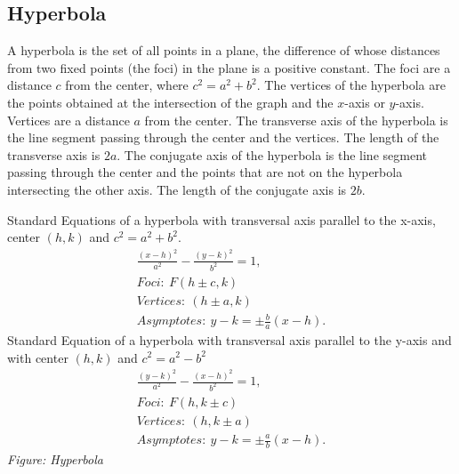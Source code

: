 \documentclass{report}
\begin{document}
      \subsection{Hyperbola}
        \smallbreak \noindent
        \begin{definition}
              \noindent A hyperbola is the set of all points in a plane, the difference of whose distances from two fixed points (the foci) in the plane is a positive constant. The foci are a distance $c$ from the center, where $c^2 = a^2 + b^2$.
          \noindent The vertices of the hyperbola are the points obtained at the intersection of the graph and the $x$-axis or $y$-axis. Vertices are a distance $a$ from the center.
          \noindent The transverse axis of the hyperbola is the line segment passing through the center and the vertices. The length of the transverse axis is $2a$.
          \noindent The conjugate axis of the hyperbola is the line segment passing through the center and the points that are not on the hyperbola intersecting the other axis. The length of the conjugate axis is $2b$.
        \end{definition}
      \bigbreak \noindent 
      \noindent Standard Equations of a hyperbola with transversal axis parallel to the x-axis, center $(h, k)$ and $c^2 = a^2 + b^2$.
      \begin{align*}
        \frac{(x-h)^{2}}{a^{2}} - \frac{(y-k)^{2}}{b^{2}} = 1, \\
         Foci:\ F(h \pm c,k) \\
        Vertices:\ (h \pm a,k) \\
        Asymptotes:\ y-k  = \pm \frac{b}{a}(x-h)
    .\end{align*}
    \bigbreak \noindent \bigbreak \noindent 
    Standard Equation of a hyperbola with transversal axis parallel to the y-axis and with center $(h, k)$ and $c^2 = a^2 - b^2$
    \begin{align*}
      \frac{(y-k)^{2}}{a^{2}} - \frac{(x-h)^{2}}{b^{2}} = 1, \\
      Foci:\ F(h,k \pm c) \\
      Vertices:\ (h,k \pm a) \\
      Asymptotes:\ y-k  = \pm \frac{a}{b}(x-h)
    .\end{align*}
    \bigbreak \noindent 
    \textit{Figure: Hyperbola}
    \begin{figure}[ht]
        \centering
        \label{fig:hyper}
    \end{figure}
\end{document}
